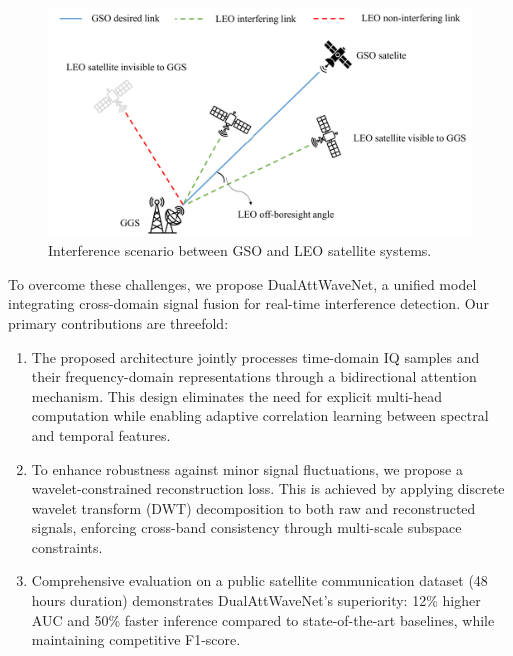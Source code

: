 \documentclass[conference]{IEEEtran}
\begin{document}
\begin{figure}[t!]
    \centering
    \includegraphics[width=\linewidth]{system-model.pdf}
    \caption{Interference scenario between GSO and LEO satellite systems.}
    \label{fig:interference-scenario}
\end{figure}

To overcome these challenges, we propose DualAttWaveNet, a unified model integrating cross-domain signal fusion for real-time interference detection. Our primary contributions are threefold:

\begin{enumerate}
    \item The proposed architecture jointly processes time-domain IQ samples and their frequency-domain representations through a bidirectional attention mechanism. This design eliminates the need for explicit multi-head computation while enabling adaptive correlation learning between spectral and temporal features.
    \item To enhance robustness against minor signal fluctuations, we propose a wavelet-constrained reconstruction loss. This is achieved by applying discrete wavelet transform (DWT) decomposition to both raw and reconstructed signals, enforcing cross-band consistency through multi-scale subspace constraints.
    \item Comprehensive evaluation on a public satellite communication dataset (48 hours duration) demonstrates DualAttWaveNet's superiority: 12\% higher AUC and 50\% faster inference compared to state-of-the-art baselines, while maintaining competitive F1-score.
\end{enumerate}
\end{document}
